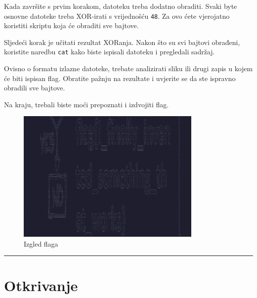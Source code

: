 \documentclass{article}
\begin{document}
    Kada završite s prvim korakom, datoteku treba dodatno obraditi. Svaki byte osnovne datoteke treba XOR-irati s vrijednošću \texttt{48}. Za ovo ćete vjerojatno koristiti skriptu koja će obraditi sve bajtove.

    Sljedeći korak je učitati rezultat XORanja. Nakon što su svi bajtovi obrađeni, koristite naredbu \texttt{cat} kako biste ispisali datoteku i pregledali sadržaj.

    Ovisno o formatu izlazne datoteke, trebate analizirati sliku ili drugi zapis u kojem će biti ispisan flag. Obratite pažnju na rezultate i uvjerite se da ste ispravno obradili sve bajtove.

    Na kraju, trebali biste moći prepoznati i izdvojiti flag.


\begin{figure}[h]
    \centering
    \includegraphics[width=0.8\textwidth]{bad xzor.png}
    \caption{Izgled flaga}
    \label{fig:flag_xzor}
\end{figure}
\noindent\rule{\textwidth}{0.4pt}


\newpage
\section{Otkrivanje}
\label{sec:discovery}
\end{document}

